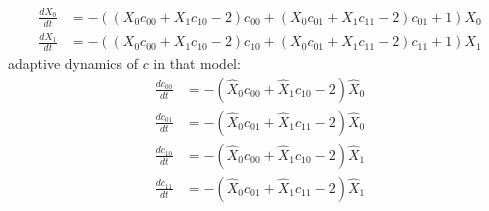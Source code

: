 \documentclass{article}
\begin{document}
\[\begin{align*}
\frac{dX_{0}}{dt} &= -{\left({\left(X_{0} c_{00} + X_{1} c_{10} - 2\right)} c_{00} + {\left(X_{0} c_{01} + X_{1} c_{11} - 2\right)} c_{01} + 1\right)} X_{0}\\
\frac{dX_{1}}{dt} &= -{\left({\left(X_{0} c_{00} + X_{1} c_{10} - 2\right)} c_{10} + {\left(X_{0} c_{01} + X_{1} c_{11} - 2\right)} c_{11} + 1\right)} X_{1}
\end{align*}\]
adaptive dynamics of $c$ in that model:
\[\begin{align*}
\frac{dc_{00}}{dt} &= -{\left(\hat{X}_{0} c_{00} + \hat{X}_{1} c_{10} - 2\right)} \hat{X}_{0}\\
\frac{dc_{01}}{dt} &= -{\left(\hat{X}_{0} c_{01} + \hat{X}_{1} c_{11} - 2\right)} \hat{X}_{0}\\
\frac{dc_{10}}{dt} &= -{\left(\hat{X}_{0} c_{00} + \hat{X}_{1} c_{10} - 2\right)} \hat{X}_{1}\\
\frac{dc_{11}}{dt} &= -{\left(\hat{X}_{0} c_{01} + \hat{X}_{1} c_{11} - 2\right)} \hat{X}_{1}
\end{align*}\]
\end{document}
